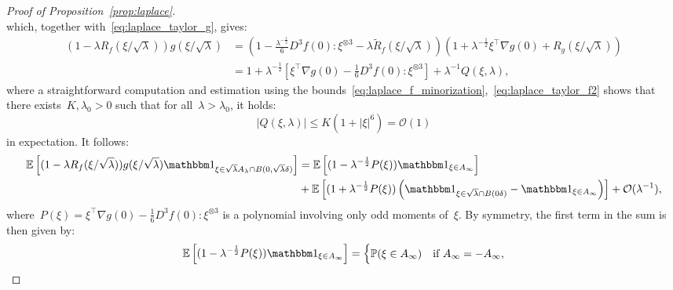 \documentclass[10pt]{article}
\newcommand{\E}{\mathbb{E}}
\renewcommand{\P}{\mathbb{P}}
\newcommand{\1}{\mathbbm 1}
\renewcommand{\O}{\mathcal{O}}
\begin{document}
\begin{proof}[Proof of Proposition~\ref{prop:laplace}]
\begin{equation}
            \end{equation}
            which, together with~\eqref{eq:laplace_taylor_g}, gives:
            \begin{equation}
                \begin{aligned}
                    (1-\lambda R_f(\xi/\sqrt\lambda))g(\xi/\sqrt\lambda) &= \left(1- \frac {\lambda^{-\frac12}}6 D^3 f(0):\xi^{\otimes 3} - \lambda\widetilde R_f(\xi/\sqrt\lambda)\right)\left(1 + \lambda^{-\frac12}\xi^\intercal \nabla g(0) + R_g(\xi/\sqrt\lambda)\right)\\
                    &= 1 + \lambda^{-\frac12}\left[\xi^\intercal \nabla g(0)-\frac16 D^3 f(0):\xi^{\otimes 3}\right] + \lambda^{-1} Q(\xi,\lambda),
                \end{aligned}
            \end{equation}
            where a straightforward computation and estimation using the bounds~\eqref{eq:laplace_f_minorization},~\eqref{eq:laplace_taylor_f2} shows that there exists~$K,\lambda_0 >0$ such that for all~$\lambda>\lambda_0$, it holds:
            \begin{equation}
                \left|Q(\xi,\lambda)\right| \leq K\left(1+|\xi|^6\right) = \O(1)
            \end{equation}
            in expectation.
            It follows:
            \begin{equation}
            \begin{aligned}
                \E\left[(1-\lambda R_f(\xi/\sqrt\lambda))g(\xi/\sqrt\lambda)\1_{\xi \in \sqrt\lambda A_\lambda \cap B(0,\sqrt\lambda \delta)}\right] &= \E\left[(1-\lambda^{-\frac12}P(\xi))\1_{\xi\in A_\infty}\right]\\ 
                &+ \E\left[(1+\lambda^{-\frac12}P(\xi))\left(\1_{\xi\in\sqrt\lambda \cap B(0\delta)}-\1_{\xi\in A_\infty}\right)\right] + \O(\lambda^{-1}),
            \end{aligned}
            \end{equation}
            where~$P(\xi) = \xi^\intercal \nabla g(0)-\frac16 D^3 f(0):\xi^{\otimes 3}$ is a polynomial involving only odd moments of~$\xi$. By symmetry, the first term in the sum is then given by:
            \begin{equation}
                \label{eq:laplace_error_b}
                \E\left[(1-\lambda^{-\frac12}P(\xi))\1_{\xi\in A_\infty}\right] = \begin{cases}
                    \P(\xi \in A_\infty)&\text{if } A_\infty = - A_\infty,\\

\end{cases}
\end{equation}
\end{proof}
\end{document}
